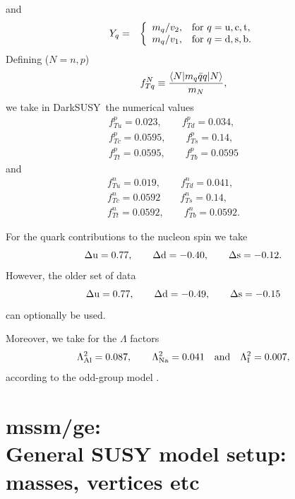 \documentclass[a4paper,10pt,oneside]{book}
\newcommand{\beq}{\begin{equation}}
\newcommand{\eeq}{\end{equation}}
\newcommand{\codeb}[1]{\ftb{#1}}
\newcommand{\ds}{{\sffamily DarkSUSY}}
\newcommand{\ftb}[1]{{\bfseries \sffamily #1}}
\begin{document}
and
\begin{eqnarray}
   Y_q & = & \left\{ \begin{array}{ll}
   m_q / v_2 , & {\rm for\ } q={\rm u,c,t}, \\
   m_q / v_1 , & {\rm for\ } q={\rm d,s,b}.
   \end{array} \right.
\end{eqnarray}
Defining ($N=n,p$)
\beq
f^N_{Tq}\equiv {\langle N |m_q\bar q q|N\rangle\over m_N},
\eeq
we take in \ds\ the numerical values \cite{Gasser:1990ce}
\begin{eqnarray}
   & f^p_{Tu} = 0.023, \qquad f^p_{Td} = 0.034, \qquad
    &\nonumber\\
&f^p_{Tc} = 0.0595, \qquad f^p_{Ts} = 0.14, \qquad&\nonumber\\
&f^p_{Tt} = 0.0595, \qquad f^p_{Tb}=0.0595 \qquad
\end{eqnarray}
and
\begin{eqnarray}
   & f^n_{Tu} = 0.019, \qquad f^n_{Td} = 0.041, \qquad
    &\nonumber\\
&f^n_{Tc} = 0.0592 \qquad f^n_{Ts} = 0.14, \qquad&\nonumber\\
&f^n_{Tt} = 0.0592, \qquad f^n_{Tb} = 0.0592. \qquad
\end{eqnarray}

For the quark contributions to the nucleon spin we
take \cite{Adams:1995ufa}
\begin{equation}
   \Delta {\rm u} = 0.77, \qquad \Delta {\rm d} = -0.40, \qquad
   \Delta {\rm s} = -0.12 .
\end{equation}
However, the older set of data \cite{Jaffe:1989jz}
\begin{equation}
   \Delta {\rm u} = 0.77, \qquad \Delta {\rm d} = -0.49, \qquad
   \Delta {\rm s} = -0.15
\end{equation}
can optionally be used.

Moreover, we take for the $\Lambda$ factors
\begin{equation}
   \Lambda^2_{\rm Al} = 0.087, \qquad
   \Lambda^2_{\rm Na} = 0.041 \quad {\rm and} \quad
   \Lambda^2_{\rm I} = 0.007,
   \label{detrate2}
\end{equation}
according to the odd-group model \cite{Engel:1989ix}.



\section[mssm/ge: General SUSY model setup: masses, vertices etc]{\codeb{mssm/ge}:\\ General SUSY model setup: masses, vertices etc}
\label{sec:src_models/mssm/ge}
\end{document}
